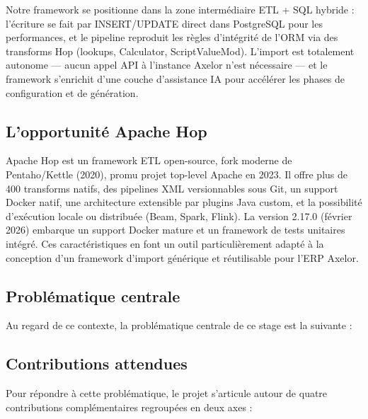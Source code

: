 \documentclass[a4paper,12pt]{article}
\begin{document}
Notre framework se positionne dans la zone intermédiaire ETL + SQL hybride : l'écriture se fait par INSERT/UPDATE direct dans PostgreSQL pour les performances, et le pipeline reproduit les règles d'intégrité de l'ORM via des transforms Hop (lookups, Calculator, ScriptValueMod). L'import est totalement autonome — aucun appel API à l'instance Axelor n'est nécessaire — et le framework s'enrichit d'une couche d'assistance IA pour accélérer les phases de configuration et de génération.

\subsection{L'opportunité Apache Hop}

Apache Hop est un framework ETL open-source, fork moderne de Pentaho/Kettle (2020), promu projet top-level Apache en 2023. Il offre plus de 400 transforms natifs, des pipelines XML versionnables sous Git, un support Docker natif, une architecture extensible par plugins Java custom, et la possibilité d'exécution locale ou distribuée (Beam, Spark, Flink). La version 2.17.0 (février 2026) embarque un support Docker mature et un framework de tests unitaires intégré. Ces caractéristiques en font un outil particulièrement adapté à la conception d'un framework d'import générique et réutilisable pour l'ERP Axelor.

\subsection{Problématique centrale}

Au regard de ce contexte, la problématique centrale de ce stage est la suivante :

\medskip
\begin{center}
\end{center}
\medskip

\subsection{Contributions attendues}

Pour répondre à cette problématique, le projet s'articule autour de quatre contributions complémentaires regroupées en deux axes :
\end{document}
